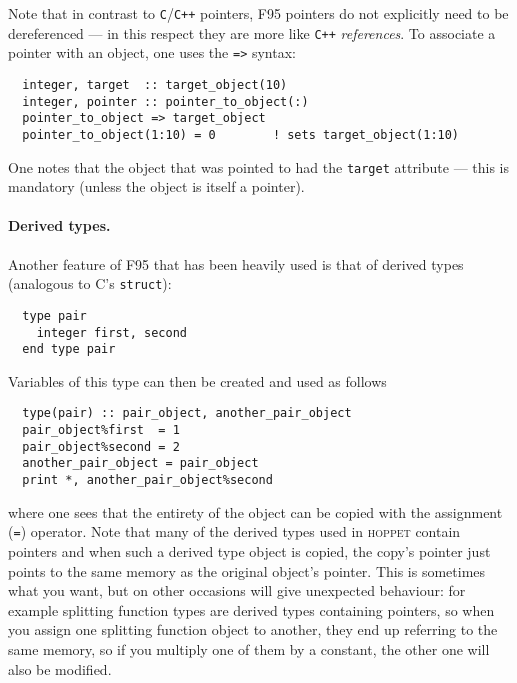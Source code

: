 \documentclass[12pt]{article}
\newcommand{\hoppet}{\textsc{hoppet}\xspace}
\newcommand{\ttt}[1]{\texttt{#1}}
\begin{document}
Note that in contrast to \ttt{C}/\ttt{C++} pointers, F95 pointers do
not explicitly need to be dereferenced --- in this respect they are
more like \ttt{C++} \emph{references}. To associate a pointer with an
object, one uses the \ttt{=>} syntax:
\begin{lstlisting}
  integer, target  :: target_object(10)
  integer, pointer :: pointer_to_object(:)
  pointer_to_object => target_object
  pointer_to_object(1:10) = 0        ! sets target_object(1:10)
\end{lstlisting}
One notes that the object that was pointed to had the \ttt{target}
attribute --- this is mandatory (unless the object is itself a
pointer).


\paragraph{Derived types.} Another feature of F95 that has been
heavily used is that of derived types (analogous to C's
\texttt{struct}):
\begin{lstlisting}
  type pair
    integer first, second
  end type pair 
\end{lstlisting}
Variables of this type can then be created and used as follows
\begin{lstlisting}
  type(pair) :: pair_object, another_pair_object
  pair_object%first  = 1
  pair_object%second = 2
  another_pair_object = pair_object
  print *, another_pair_object%second
\end{lstlisting}
where one sees that the entirety of the object can be copied with the
assignment (\texttt{=}) operator. Note that many of the derived types
used in \hoppet contain pointers and when such a derived type object
is copied, the copy's pointer just points to the same memory as the
original object's pointer. This is sometimes what you want, but on
other occasions will give unexpected behaviour: for example splitting
function types are derived types containing pointers, so when you
assign one splitting function object to another, they end up referring
to the same memory, so if you multiply one of them by a constant, the
other one will also be modified.
\end{document}

